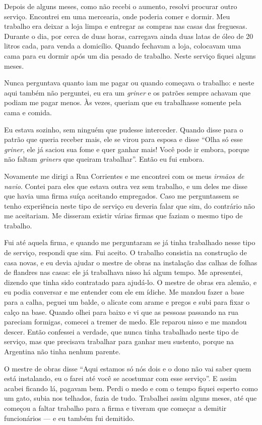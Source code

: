 Depois de alguns meses, como não recebi o aumento, resolvi procurar
outro serviço. Encontrei em uma mercearia, onde poderia comer e dormir. Meu trabalho era deixar a loja limpa e entregar as compras nas
casas das freguesas. Durante o dia, por cerca de duas horas, carregava ainda duas
latas de óleo de 20 litros cada, para venda a domicílio. Quando
fechavam a loja, colocavam uma cama para eu dormir após um dia pesado
de trabalho. Neste serviço fiquei alguns meses. 

Nunca perguntava
quanto iam me pagar ou quando começava o trabalho: e neste aqui também não
perguntei, eu era um \textit{griner} e os patrões sempre achavam que
podiam me pagar menos. Às vezes, queriam que eu trabalhasse somente
pela cama e comida.

Eu estava sozinho, sem ninguém que pudesse interceder. Quando disse
para o patrão que queria receber mais, ele se virou para esposa e
disse ``Olha só esse \textit{griner}, ele já saciou sua fome e quer
ganhar mais! Você pode ir embora, porque não faltam \textit{griners} que
queiram trabalhar''. Então eu fui embora.

Novamente me dirigi a Rua Corrientes e me encontrei com os meus \textit{irmãos
de navio}. Contei para eles que estava outra vez sem trabalho, e um
deles me disse que havia uma firma suíça aceitando empregados. 
Caso me perguntassem se tenho experiência neste
tipo de serviço eu deveria falar que sim, do contrário não me
aceitariam. Me disseram existir várias firmas que faziam o mesmo
tipo de trabalho.

Fui até aquela firma, e quando me perguntaram se já tinha
trabalhado nesse tipo de serviço, respondi que sim. Fui aceito. O
trabalho consistia na construção de casa novas, e eu devia ajudar o mestre
de obras na instalação das calhas de folhas de flandres nas casas: ele já trabalhava nisso há algum tempo. 
Me apresentei, dizendo
que tinha sido contratado para ajudá-lo. O mestre de obras era alemão, e eu
podia conversar e me entender com ele em ídiche. Me mandou fazer a base
para a calha, peguei um balde, o alicate com arame e pregos e subi para
fixar o calço na base. Quando olhei para baixo e vi que as pessoas
passando na rua pareciam formigas, comecei a tremer de medo. Ele
reparou nisso e me mandou descer. Então confessei a verdade, que
nunca tinha trabalhado neste tipo de serviço, mas que precisava
trabalhar para ganhar meu sustento, porque na Argentina não
tinha nenhum parente.

O mestre de obras disse ``Aqui estamos só nós dois e o dono não vai
saber quem está instalando, eu o farei até você se acostumar com esse
serviço''. E assim acabei ficando lá, pagavam bem. Perdi o medo e
com o tempo fiquei esperto como um gato, subia nos telhados, fazia de
tudo. Trabalhei assim alguns meses, até que começou a faltar trabalho
para a firma e tiveram que começar a demitir funcionários --- e eu também fui demitido.

